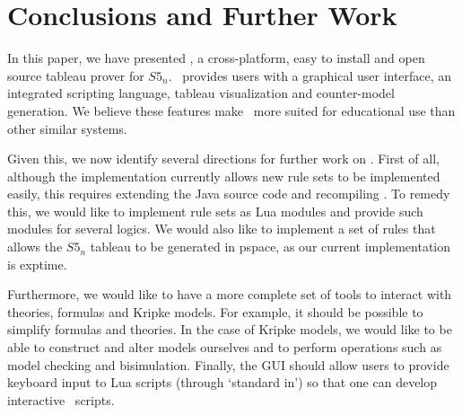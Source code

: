 \section{Conclusions and Further Work}
\label{sec:discussion}

In this paper, we have presented \oops, a cross-platform, easy to install and
open source tableau prover for $S5_n$.
\oops\ provides users with a graphical user interface, an integrated scripting
language, tableau visualization and counter-model generation. 
We believe these features make \oops\ more suited for educational use than
other similar systems.

Given this, we now identify several directions for further work on \oops.
First of all, although the implementation currently allows new rule sets to be
implemented easily, this requires extending the Java source code and
recompiling \oops. To remedy this, we would like to implement rule sets as Lua
modules and provide such modules for several logics. We would also like to
implement a set of rules that allows the $S5_n$ tableau to be generated in
{\sc pspace}, as our current implementation is {\sc exptime}.

Furthermore, we would like to have a more complete set of tools to interact
with theories, formulas and Kripke models. For example, it should be possible
to simplify formulas and theories. In the case of Kripke models, we would like
to be able to construct and alter models ourselves and to perform operations
such as model checking and bisimulation. Finally, the GUI should allow users
to provide keyboard input to Lua scripts (through `standard in') so that one
can develop interactive \oops\ scripts.
